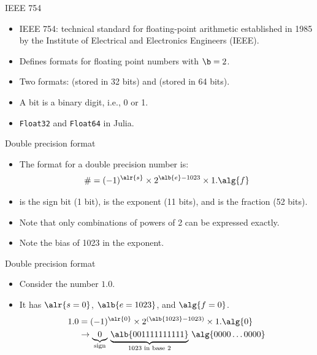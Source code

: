 \documentclass[11pt,xcolor={dvipsnames},aspectratio=159,hyperref={pdftex,pdfpagemode=UseNone,hidelinks,pdfdisplaydoctitle=true},usepdftitle=false]{beamer}
\begin{document}
    \begin{frame}{IEEE 754}
        \begin{itemize}
            \item IEEE 754: technical standard for floating-point arithmetic established in 1985 by the Institute of Electrical and Electronics Engineers (IEEE).
            \item Defines formats for floating point numbers with $\b=2$.
            \item Two formats:  (stored in 32 bits) and  (stored in 64 bits).
            \item A bit is a binary digit, i.e., 0 or 1.
            \item \texttt{Float32} and \texttt{Float64} in Julia.
        \end{itemize}
    \end{frame}
        


\begin{frame}{Double precision format}
\begin{itemize}
    \item The format for a double precision number is:
   \begin{align*}
        \# = (-1)^{\alr{s}} \times 2^{\alb{e}-1023} \times 1.\alg{f}         
    \end{align*}
    \item {} is the sign bit (1 bit),  is the exponent (11 bits), and  is the fraction (52 bits).
    \item Note that only combinations of powers of 2 can be expressed exactly.
    \item Note the bias of 1023 in the exponent.
\end{itemize}
\end{frame}

\begin{frame}{Double precision format}
    \begin{itemize}
    
        \item Consider the number $1.0$.
        \item It has $\alr{s = 0}$, $\alb{e = 1023}$, and $\alg{f = 0}$.
       \begin{align*}
            1.0 & = (-1)^{\alr{0}} \times 2^{(\alb{1023} -1023)} \times 1.\alg{0}   \\
                & \rightarrow \underbrace{0}_{\text{sign}}\, \underbrace{\alb{0011 1111 1111}}_{1023 \text{ in base 2}}\, \alg{0000 \ldots 0000}
        \end{align*}
    \end{itemize}
    
\end{frame}
\end{document}
